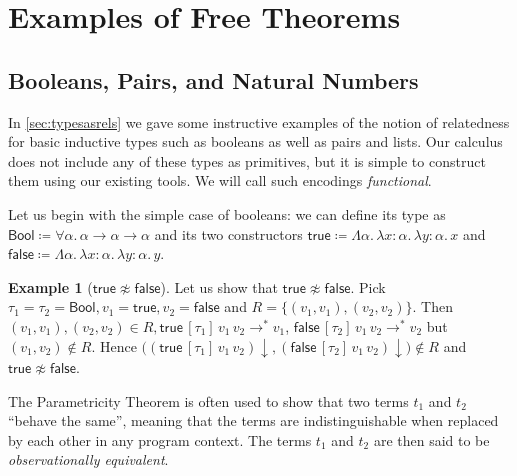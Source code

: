 \documentclass[12pt]{article}
\theoremstyle{plain}
\theoremstyle{definition}
\newtheorem{exmpl}[equation]{Example}
\newcommand{\bool}{\mathsf{Bool}}
\newcommand{\true}{\mathsf{true}}
\newcommand{\false}{\mathsf{false}}
\newcommand{\nf}[1]{#1{\downarrow}}
\begin{document}
\section{Examples of Free Theorems}\label{sec:exmpls}

\subsection{Booleans, Pairs, and Natural Numbers}\label{sec:boolpair}

In \cref{sec:typesasrels} we gave some instructive examples of the notion of relatedness for basic inductive types such as booleans as well as pairs and lists.
Our calculus does not include any of these types as primitives, but it is simple to
construct them using our existing tools.
We will call such encodings \emph{functional}.

Let us begin with the simple case of booleans:
we can define its type as $\bool \coloneqq \forall \alpha.\, \alpha\to\alpha\to\alpha$
and its two constructors $\true\coloneqq \Lambda \alpha.\, \lambda x : \alpha.\, \lambda y : \alpha.\, x$ and
$\false\coloneqq \Lambda \alpha.\, \lambda x : \alpha.\,\lambda  y : \alpha.\, y$.
\begin{exmpl}[$\true\not\approx\false$]
Let us show that $\true\not\approx\false$.
Pick $\tau_1=\tau_2=\bool,v_1=\true,v_2=\false$ and $R=\{(v_1,v_1),(v_2,v_2)\}$.
Then $(v_1,v_1),(v_2,v_2)\in R,\allowbreak\true\, [\tau_1]\,v_1\, v_2 \to^* v_1$, $\false\, [\tau_2]\,v_1\,v_2 \to^* v_2$ but $(v_1,v_2)\notin R$.
Hence $\bigl(\nf{(\true \,[\tau_1]\,v_1\,v_2)}, \nf{(\false \,[\tau_2]\,v_1\,v_2)}\bigr)\notin R$ and $\true\not\approx\false$.
\end{exmpl}

The Parametricity Theorem is often used to show that two terms $t_1$ and $t_2$ ``behave the same'',
meaning that the terms are indistinguishable when replaced by each other in any program context.
The terms $t_1$ and $t_2$ are then said to be \emph{observationally equivalent}.
\end{document}
